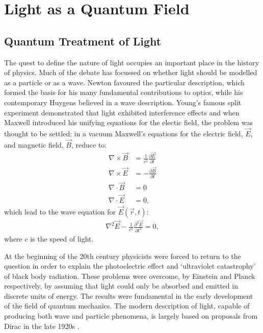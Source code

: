 \chapter{Light as a Quantum Field} 
\label{ch:Light}

\section{Quantum Treatment of Light}

The quest to define the nature of light occupies an important place in the history of physics. Much of the debate has focussed on whether light should be modelled as a particle or as a wave. Newton favoured the particular description, which formed the basis for his many fundamental contributions to optics, while his contemporary Huygens believed in a wave description. Young's famous split experiment demonstrated that light exhibited interference effects and when Maxwell introduced his unifying equations for the electic field, the problem was thought to be settled: in a vacuum Maxwell's equations for the electric field, $\vec{E}$, and magnetic field, $\vec{B}$, reduce to:
\begin{align}
  \nabla \times \vec{B} &= \frac{1}{c^2} \frac{\partial \vec{E}}{\partial t} \label{maxwell_be} \\
  \nabla \times \vec{E} &= - \frac{\partial \vec{B}}{\partial t}\\
  \nabla \cdot \vec{B} &= 0 \\
  \nabla \cdot \vec{E} &= 0,
\end{align}
which lead to the wave equation for $\vec{E}(\vec{r}, t)$:
\begin{align}\label{wave_eq}
  \nabla^2\vec{E} - \frac{1}{c^2} \frac{\partial^2 \vec{E}}{\partial t^2} = 0,
\end{align}
where $c$ is the speed of light.

At the beginning of the 20th century physicists were forced to return to the question in order to explain the photoelectric effect and `ultraviolet catastrophy' of black body radiation. These problems were overcome, by Einstein \cite{einstein_photoelectric} and Planck \cite{planck_constant} respectively, by assuming that light could only be absorbed and emitted in discrete units of energy. The results were fundamental in the early development of the field of quantum mechanics. The modern description of light, capable of producing both wave and particle phenomena, is largely based on proposals from Dirac in the late 1920s \cite{dirac_1927}.

